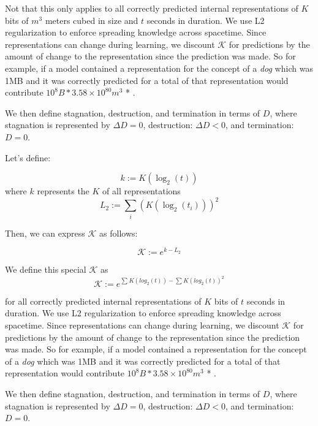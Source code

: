 \documentclass{article}
\begin{document}
Not that this only applies to all correctly predicted internal representations of $K$ bits of  $m^3$ meters cubed in size and $t$ seconds in duration. We use L2 regularization to enforce spreading knowledge across spacetime. Since representations can change during learning, we discount $\mathcal{K}$ for predictions by the amount of change to the representation since the prediction was made. So for example, if a model contained a representation for the concept of a \emph{dog} which was 1MB and it was correctly predicted for a total of  that representation would contribute $10^{8}B * 3.58×10^{80}m^3$ * .

We then define stagnation, destruction, and termination in terms of $D$, where stagnation is represented by $\Delta D = 0$, destruction: $\Delta D < 0$, and termination: $D = 0$.

Let's define:

\[
k := K(\log_{2}(t))
\]
where $k$ represents the $K$ of all representations
\[
L_{2} := \sum_{i} (K(\log_{2}(t_i)))^2
\]

Then, we can express \(\mathcal{K}\) as follows:

\[
\mathcal{K} := e^{k - L_{2}}
\]

We define this special $\mathcal{K}$ as
\[
\mathcal{K}:= e^{{\sum_{}K(log_{2}(t)) - \sum_{}K(log_{2}(t))^{2}}}
\]

for all correctly predicted internal representations of $K$ bits of  $t$ seconds in duration. We use L2 regularization to enforce spreading knowledge across spacetime. Since representations can change during learning, we discount $\mathcal{K}$ for predictions by the amount of change to the representation since the prediction was made. So for example, if a model contained a representation for the concept of a \emph{dog} which was 1MB and it was correctly predicted for a total of  that representation would contribute $10^{8}B * 3.58×10^{80}m^3$ * .

We then define stagnation, destruction, and termination in terms of $D$, where stagnation is represented by $\Delta D = 0$, destruction: $\Delta D < 0$, and termination: $D = 0$.
\end{document}
